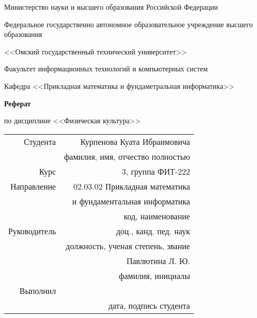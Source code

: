\documentclass[a4paper]{article}
\begin{document}
    \thispagestyle{empty}

    \begin{center}
        Министерство науки и высшего образования Российской Федерации

        Федеральное государственно автономное образовательное учреждение высшего образования

        <<Омский государственный технический университет>>

        \vspace{1cm}
        Факультет информационных технологий и компьютерных систем

        Кафедра <<Прикладная математика и фундаметральная информатика>>

        \vspace{3cm}
        \textbf{Реферат}

        по дисциплине <<Физическая культура>>
    \end{center}
    
    \vspace{3cm}
    \begin{flushright}    
        \begin{tabular}{ r r }
            Студента & Курпенова Куата Ибраимовича \\
            \cline{2-2}
            & \tiny{фамилия, имя, отчество полностью} \\

            Курс & 3, группа ФИТ-222 \\
            \cline{2-2}
            Направление & 02.03.02 Прикладная математика \\
            \cline{2-2}
            & и фундаментальная информатика \\
            \cline{2-2}
            & \tiny{код, наименование} \\
            
            Руководитель & доц., канд. пед. наук \\
            \cline{2-2}
            & \tiny{должность, ученая степень, звание} \\
            & Павлютина Л. Ю. \\
            \cline{2-2}
            & \tiny{фамилия, инициалы} \\
            
            Выполнил & \\
            \cline{2-2}
            & \tiny{дата, подпись студента} \\
            
        \end{tabular}
    \end{flushright}
    
\end{document}
